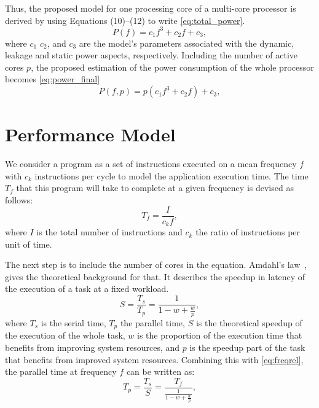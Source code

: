 Thus, the proposed model for one processing core of a multi-core processor is derived by using Equations (10)--(12) to write \cref{eq:total_power}.
\begin{equation}
	P(f)= c_1f^3+c_2f+c_3,
	\label{eq:total_power}
\end{equation}
where $c_1$ $c_2$, and $c_3$ are the model's parameters associated with the dynamic, leakage and static power aspects, respectively. Including the number of active cores $p$, the proposed estimation of the power consumption of the whole processor becomes \cref{eq:power_final}
\begin{equation}
	P(f,p)= p(c_1f^3+c_2f)+c_3,
	\label{eq:power_final}
\end{equation}

\section{Performance Model} \label{sec:performance_model}
We consider a program as a set of instructions executed on a mean frequency $f$ with $c_k$ instructions per cycle to model the application execution time. The time $T_f$ that this program will take to complete at a given frequency is devised as follows:
\begin{equation}
	T_f=\frac{I}{c_kf},
	\label{eq:freqrel}
\end{equation}
where $I$ is the total number of instructions and $c_k$ the ratio of instructions per unit of time.

The next step is to include the number of cores in the equation. Amdahl's law~\cite{Amdahl1967ValidityCapabilities}, gives the theoretical background for that. It describes the speedup in latency of the execution of a task at a fixed workload.
\begin{equation}
	S=\frac{T_s}{T_p}=\frac{1}{1-w+\frac{w}{p}},
	\label{eq:amdahl}
\end{equation}
where $T_s$ is the serial time, $T_p$ the parallel time, $S$ is the theoretical speedup of the execution of the whole task, $w$ is the proportion of the execution time that benefits from improving system resources, and $p$ is the speedup part of the task that benefits from improved system resources. Combining this with \cref{eq:freqrel}, the parallel time at frequency $f$ can be written as:
\begin{equation}
	T_p=\frac{T_s}{S}=\frac{T_f}{\frac{1}{1-w+\frac{w}{p}}},
	\label{eq:parallel_time}
\end{equation}

